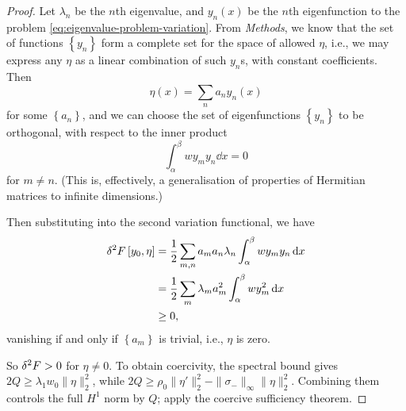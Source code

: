 \documentclass[11pt]{article}
\numberwithin{equation}{section}
\theoremstyle{definition}
\theoremstyle{remark}
\newcommand{\pqty}[1]{\left(#1\right)}
\newcommand{\bqty}[1]{\left[#1\right]}
\newcommand{\Bqty}[1]{\left\{#1\right\}}
\begin{document}
\begin{proof}
    Let \(\lambda_n\) be the \(n\)th eigenvalue, and \(y_n\pqty{x}\) be the \(n\)th eigenfunction to the problem \autoref{eq:eigenvalue-problem-variation}. From \textit{Methods}, we know that the set of functions \(\Bqty{y_n}\) form a complete set for the space of allowed \(\eta\), i.e., we may express any \(\eta\) as a linear combination of such \(y_n\)s, with constant coefficients. Then
    \[
        \eta\pqty{x} = \sum_{n} a_n y_n \pqty{x}
    \]
    for some \(\Bqty{a_n}\), and we can choose the set of eigenfunctions \(\Bqty{y_n}\) to be orthogonal, with respect to the inner product
    \[
        \int_{\alpha}^{\beta} w y_m y_n \dd{x} = 0
    \]
    for \(m \neq n\). (This is, effectively, a generalisation of properties of Hermitian matrices to infinite dimensions.)

    Then substituting into the second variation functional, we have
    \begin{align*}
        \var[2]{F\bqty{y_0, \eta}} &= \frac{1}{2} \sum_{m, n} a_m a_n \lambda_n \int_{\alpha}^{\beta} w y_m y_n \dd{x} \\
        &= \frac{1}{2} \sum_{m} \lambda_m a_m^2 \int_{\alpha}^{\beta} w y_m^2 \dd{x} \\
        &\geq 0,
    \end{align*}
    vanishing if and only if \(\Bqty{a_m}\) is trivial, i.e., \(\eta\) is zero.

    So \(\var[2]{F} > 0\) for \(\eta \neq 0\). To obtain coercivity, the spectral bound gives \(2Q\ge\lambda_1 w_0\|\eta\|_2^2\), while \(2Q\ge\rho_0\|\eta\prime\|_2^2-\|\sigma_-\|_\infty\|\eta\|_2^2\). Combining them controls the full \(H^1\) norm by \(Q\); apply the coercive sufficiency theorem.
\end{proof}
\end{document}

